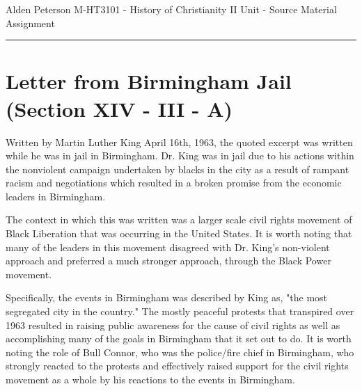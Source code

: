 \documentclass[12pt]{turabian-researchpaper}
\begin{document}
\begin{singlespace}
\noindent Alden Peterson \newline
\noindent M-HT3101 - History of Christianity II\newline
\noindent Unit  - Source Material Assignment
\newline\noindent\rule{4cm}{0.4pt}
\end{singlespace}




\section{Letter from Birmingham Jail (Section XIV - III - A)}

Written by Martin Luther King April 16th, 1963, the quoted excerpt was written while he was in jail in Birmingham.\autocite[pg.360]{bettenson2011documents} Dr. King was in jail due to his actions within the nonviolent campaign undertaken by blacks in the city as a result of rampant racism and negotiations which resulted in a broken promise from the economic leaders in Birmingham.\autocite[pg.361]{bettenson2011documents}

The context in which this was written was a larger scale civil rights movement of Black Liberation that was occurring in the United States.\autocite[pg.735]{woodbridge2013}  It is worth noting that many of the leaders in this movement disagreed with Dr. King's non-violent approach and preferred a much stronger approach, through the Black Power movement.\autocite[pg.735]{woodbridge2013} 

Specifically, the events in Birmingham was described by King as, "the most segregated city in the country."\autocite{wiki:Birmingham} The mostly peaceful protests that transpired over 1963 resulted in raising public awareness for the cause of civil rights as well as accomplishing many of the goals in Birmingham that it set out to do.\autocite{wiki:Birmingham} It is worth noting the role of Bull Connor, who was the police/fire chief in Birmingham, who strongly reacted to the protests and effectively raised support for the civil rights movement as a whole by his reactions to the events in Birmingham.\autocite{wiki:Birmingham}
\end{document}
